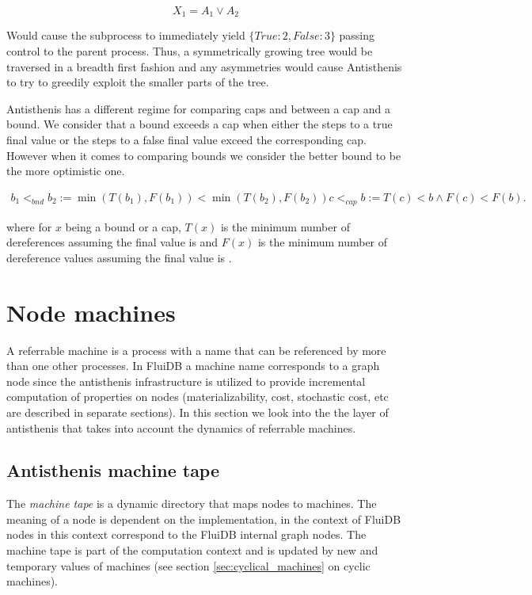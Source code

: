 \[
X_1 = A_1 \lor A_2
\]

Would cause the subprocess to immediately yield
\(\{True: 2, False: 3 \}\) passing control to the parent
process. Thus, a symmetrically growing tree would be traversed in a
breadth first fashion and any asymmetries would cause Antisthenis to
try to greedily exploit the smaller parts of the tree.

Antisthenis has a different regime for comparing caps and between a
cap and a bound. We consider that a bound exceeds a cap when either
the steps to a true final value or the steps to a false final value
exceed the corresponding cap. However when it comes to comparing
bounds we consider the better bound to be the more optimistic one.

\begin{align*}
b_1 <_{bnd} b_2 := \min(T(b_1),F(b_1)) < \min(T(b_2),F(b_2))
c <_{cap} b := T(c) < b \land F(c) < F(b).
\end{align*}

where for \(x\) being a bound or a cap, \(T(x)\) is the minimum number
of dereferences assuming the final value is  and \(F(x)\)
is the minimum number of dereference values assuming the final value
is .

\section{Node machines}

A referrable machine is a process with a name that can be referenced
by more than one other processes. In FluiDB a machine name corresponds
to a graph node since the antisthenis infrastructure is utilized to
provide incremental computation of properties on nodes
(materializability, cost, stochastic cost, etc are described in
separate sections). In this section we look into the the layer of
antisthenis that takes into account the dynamics of referrable
machines.

\subsection{Antisthenis machine tape}

The \emph{machine tape} is a dynamic directory that maps nodes to
machines. The meaning of a node is dependent on the implementation, in
the context of FluiDB nodes in this context correspond to the FluiDB
internal graph nodes.  The machine tape is part of the computation
context and is updated by new and temporary values of machines (see
section \ref{sec:cyclical_machines} on cyclic machines).

